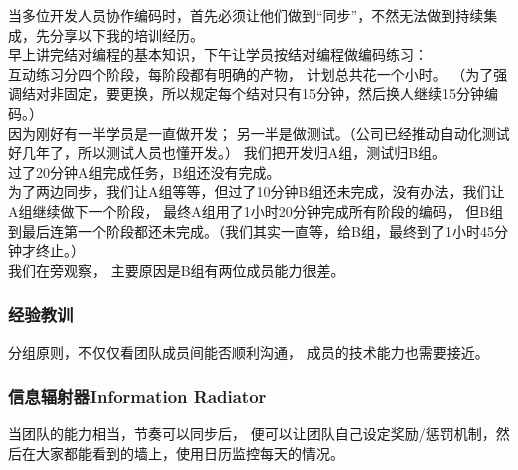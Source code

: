 当多位开发人员协作编码时，首先必须让他们做到``同步''，不然无法做到持续集成，先分享以下我的培训经历。\\
早上讲完结对编程的基本知识，下午让学员按结对编程做编码练习：\\
互动练习分四个阶段，每阶段都有明确的产物， 计划总共花一个小时。
（为了强调结对非固定，要更换，所以规定每个结对只有15分钟，然后换人继续15分钟编码。）\\
因为刚好有一半学员是一直做开发；
另一半是做测试。（公司已经推动自动化测试好几年了，所以测试人员也懂开发。）
我们把开发归A组，测试归B组。\\
过了20分钟A组完成任务，B组还没有完成。\\
为了两边同步，我们让A组等等，但过了10分钟B组还未完成，没有办法，我们让A组继续做下一个阶段，
最终A组用了1小时20分钟完成所有阶段的编码，
但B组到最后连第一个阶段都还未完成。（我们其实一直等，给B组，最终到了1小时45分钟才终止。）\\
我们在旁观察， 主要原因是B组有两位成员能力很差。

\hypertarget{ux7ecfux9a8cux6559ux8bad}{%
\subsubsection{经验教训}\label{ux7ecfux9a8cux6559ux8bad}}

分组原则，不仅仅看团队成员间能否顺利沟通， 成员的技术能力也需要接近。

\hypertarget{ux4fe1ux606fux8f90ux5c04ux5668information-radiator}{%
\subsubsection{信息辐射器Information
Radiator}\label{ux4fe1ux606fux8f90ux5c04ux5668information-radiator}}

当团队的能力相当，节奏可以同步后，
便可以让团队自己设定奖励/惩罚机制，然后在大家都能看到的墙上，使用日历监控每天的情况。


